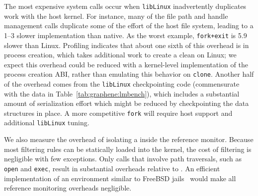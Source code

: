 The most expensive system calls occur when {\tt libLinux} inadvertently duplicates work
with the host kernel.  
For instance, many of the file path and handle management calls duplicate some of the effort of the host file system,
leading to a 1--3\x{} slower implementation than native.
As the worst example,
{\tt fork+exit} is 5.9\x{} slower than Linux.
Profiling indicates that about one sixth of this overhead is in process creation, which 
takes additional work to create a clean \picoproc{} on Linux; we expect this overhead could be reduced
with a kernel-level implementation of the process creation ABI, rather than emulating this behavior on {\tt clone}.
Another half of the overhead comes from the
{\tt libLinux} checkpointing code (commensurate with the data in Table~\ref{tab:graphene:lmbench}), which 
includes a substantial amount of serialization effort which might be reduced by checkpointing the data structures in place.
A more competitive {\tt fork} will require host support and additional {\tt libLinux} tuning.

We also measure the overhead of isolating a \graphene{} \picoproc{} inside the reference monitor.
Because most filtering rules can be statically loaded into the kernel,
the cost of filtering is negligible with few exceptions.
Only calls that
involve path traversals, such as {\tt open} and {\tt exec}, result in substantial overheads relative to \graphene{}.
An efficient implementation of an environment similar to FreeBSD  jails~\cite{jails}
would make all reference monitoring overheads negligible.

